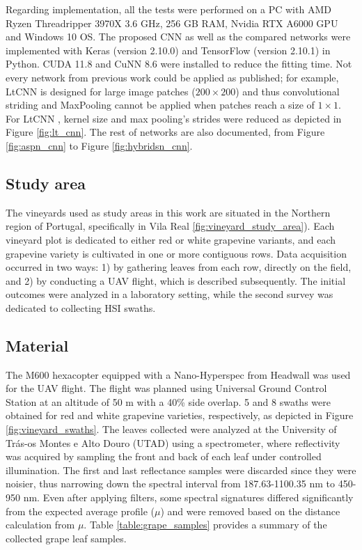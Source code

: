 Regarding implementation, all the tests were performed on a PC with AMD Ryzen Threadripper 3970X 3.6 GHz, 256 GB RAM, Nvidia RTX A6000 GPU and Windows 10 OS. The proposed CNN as well as the compared networks were implemented with Keras (version 2.10.0) and TensorFlow (version 2.10.1) in Python. CUDA 11.8 and CuNN 8.6 were installed to reduce the fitting time. Not every network from previous work could be applied as published; for example, LtCNN is designed for large image patches ($200\times200$) and thus convolutional striding and MaxPooling cannot be applied when patches reach a size of $1\times1$. For LtCNN \cite{lu_hyperspectral_2022}, kernel size and max pooling's strides were reduced as depicted in Figure \ref{fig:lt_cnn}. The rest of networks are also documented, from Figure \ref{fig:aspn_cnn} to Figure \ref{fig:hybridsn_cnn}.

\subsection{Study area}

The vineyards used as study areas in this work are situated in the Northern region of Portugal, specifically in Vila Real \ref{fig:vineyard_study_area}). Each vineyard plot is dedicated to either red or white grapevine variants, and each grapevine variety is cultivated in one or more contiguous rows. Data acquisition occurred in two ways: 1) by gathering leaves from each row, directly on the field, and 2) by conducting a UAV flight, which is described subsequently. The initial outcomes were analyzed in a laboratory setting, while the second survey was dedicated to collecting HSI swaths.

\subsection{Material}

The M600 hexacopter equipped with a Nano-Hyperspec from Headwall was used for the UAV flight. The flight was planned using Universal Ground Control Station at an altitude of 50 \si{\meter} with a 40\% side overlap. 5 and 8 swaths were obtained for red and white grapevine varieties, respectively, as depicted in Figure \ref{fig:vineyard_swaths}. The leaves collected were analyzed at the University of Trás-os Montes e Alto Douro (UTAD) using a spectrometer, where reflectivity was acquired by sampling the front and back of each leaf under controlled illumination. The first and last reflectance samples were discarded since they were noisier, thus narrowing down the spectral interval from 187.63-1100.35 \si{\nano\meter} to 450-950 \si{\nano\meter}. Even after applying filters, some spectral signatures differed significantly from the expected average profile ($\mu$) and were removed based on the distance calculation from $\mu$. Table \ref{table:grape_samples} provides a summary of the collected grape leaf samples.

